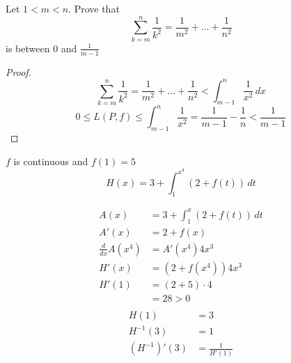 \begin{question}{4}
  Let $1 < m < n$. Prove that 
  \[\sum_{k=m}^n \frac{1}{k^2} = \frac{1}{m^2} +\dotsc + \frac{1}{n^2}\] 
  is between $0$ and $\frac{1}{m-1}$
\end{question}

\begin{proof}
 \[ \sum_{k=m}^n \frac{1}{k^2} = \frac{1}{m^2} +\dotsc + \frac{1}{n^2} < \int_{m-1}^{n} \frac{1}{x^2} \,dx\]
 \[0 \le L(P, f) \le \int_{m-1}^n\frac{1}{x^2} = \frac{1}{m-1} - \frac{1}{n} < \frac{1}{m-1}\]
\end{proof}

\begin{question}{6}
  $f$ is continuous and $f(1) = 5$
  \[H(x) = 3 + \int_1^{x^4} (2+f(t))\, dt\] 
\end{question}

\begin{align*}
  A(x) &= 3 + \int_1^{x} (2+f(t))\, dt \\
  A'(x) &= 2 + f(x) \\
  \frac{d}{dx} A(x^4) &= A'(x^4)4x^3 \\
  H'(x)&= (2+ f(x^4))4x^3 \\
  H'(1) &= (2 + 5)\cdot 4 \\
      &= 28 > 0 \\
\end{align*}
\begin{align*}
  H(1) &= 3 \\
  H^{-1}(3) &= 1 \\ 
  (H^{-1})'(3) &= \frac{1}{H'(1)} \\
\end{align*}
